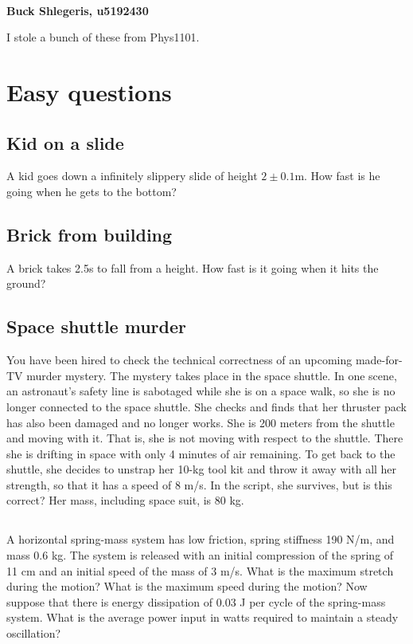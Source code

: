 \documentclass[12pt]{amsart}
\begin{document}
\vspace*{1cm}
\begin{center}
\Large\bfseries{}\\
\large{Buck Shlegeris, u5192430}\\
\end{center}

\vspace{1cm}

I stole a bunch of these from Phys1101.

\section{Easy questions}

\subsection{Kid on a slide}

A kid goes down a infinitely slippery slide of height $2\pm0.1$m. How fast is he going when he gets to the bottom?

\subsection{Brick from building}

A brick takes 2.5s to fall from a height. How fast is it going when it hits the ground?

\subsection{Space shuttle murder}
You have been hired to check the technical correctness of an upcoming made-for-TV murder mystery. The mystery takes place in the space shuttle. In one scene, an astronaut's safety line is sabotaged while she is on a space walk, so she is no longer connected to the space shuttle. She checks and finds that her thruster pack has also been damaged and no longer works. She is 200 meters from the shuttle and moving with it. That is, she is not moving with respect to the shuttle. There she is drifting in space with only 4 minutes of air remaining. To get back to the shuttle, she decides to unstrap her 10-kg tool kit and throw it away with all her strength, so that it has a speed of 8 m/s. In the script, she survives, but is this correct? Her mass, including space suit, is 80 kg.

\subsection{}
A horizontal spring-mass system has low friction, spring stiffness 190 N/m, and mass 0.6 kg. The system is released with an initial compression of the spring of 11 cm and an initial speed of the mass of 3 m/s. What is the maximum stretch during the motion? What is the maximum speed during the motion? Now suppose that there is energy dissipation of 0.03 J per cycle of the
spring-mass system. What is the average power input in watts required to maintain a steady oscillation?
\end{document}
